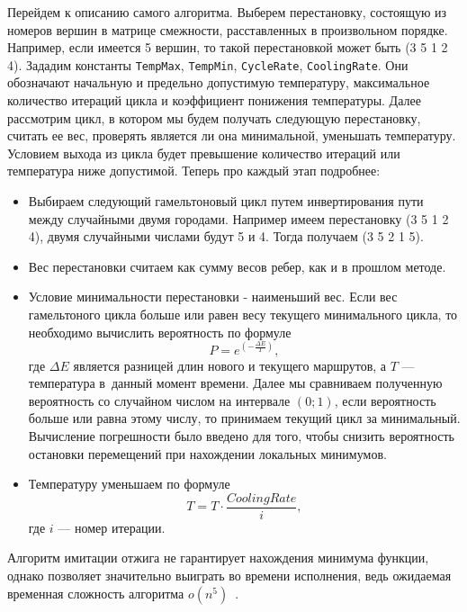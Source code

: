 \documentclass[12pt, a4paper]{article}
\begin{document}
Перейдем к описанию самого алгоритма. Выберем перестановку, состоящую из номеров вершин в матрице смежности, расставленных в произвольном порядке. Например, если имеется 5 вершин, то такой перестановкой может быть (3 5 1 2 4). Зададим константы \texttt{TempMax}, \texttt{TempMin},  \texttt{CycleRate}, \texttt{CoolingRate}. Они обозначают начальную и предельно допустимую температуру, максимальное количество итераций цикла и коэффициент понижения температуры.
Далее рассмотрим цикл, в котором мы будем получать следующую перестановку, считать ее вес, проверять является ли она минимальной, уменьшать температуру. Условием выхода из цикла будет превышение количество итераций или температура ниже допустимой. Теперь про каждый этап подробнее:
\begin{itemize}
	\item Выбираем следующий гамельтоновый цикл путем инвертирования пути между случайными двумя городами. Например имеем перестановку (3 5 1 2 4), двумя случайными числами будут 5 и 4. Тогда получаем (3 5 2 1 5).
	\item Вес перестановки считаем как сумму весов ребер, как и в прошлом методе.
	\item Условие минимальности перестановки - наименьший вес. Если вес гамельтоного цикла больше или равен весу текущего минимального цикла, то необходимо вычислить вероятность по формуле 
	\begin{equation}
		\label{prob}
		P=e^{\left(-\frac{\Delta E}{T}\right)},
	\end{equation}
	где $\Delta E$ является разницей длин нового и текущего маршрутов, а $T$ --- температура в~данный момент времени. Далее мы сравниваем полученную вероятность со случайном числом на интервале $(0; 1)$, если вероятность больше или равна этому числу, то принимаем текущий цикл за минимальный. Вычисление погрешности было введено для того, чтобы снизить вероятность остановки перемещений при нахождении локальных минимумов.
	\item Температуру уменьшаем по формуле
	\[
		T = T \cdot \frac{CoolingRate}{i},
	\]
	где $i$ --- номер итерации. 
\end{itemize}

Алгоритм имитации отжига не гарантирует нахождения минимума функции, однако позволяет значительно выиграть во времени исполнения, ведь ожидаемая временная сложность алгоритма $o(n^5)$~\cite{mitpaper}.
\end{document}

